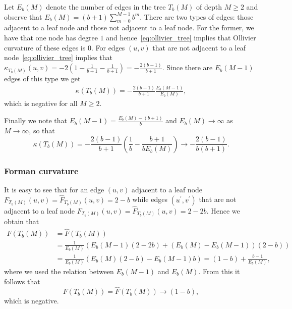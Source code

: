 \documentclass[runningheads]{llncs}
\begin{document}
Let $E_b(M)$ denote the number of edges in the tree $T_b(M)$ of depth $M \ge 2$ and observe that $E_b(M) = (b+1) \sum_{m =0}^{M-1} b^m$. There are two types of edges: those adjacent to a leaf node and those not adjacent to a leaf node. For the former, we have that one node has degree $1$ and hence~\eqref{eq:ollivier_tree} implies that Ollivier curvature of these edges is $0$. For edges $(u,v)$ that are not adjacent to a leaf node~\eqref{eq:ollivier_tree} implies that $\kappa_{T_b(M)}(u,v) = -2 \left(1 - \frac{1}{b+1} - \frac{1}{b+1} \right) = -\frac{2(b-1)}{b+1}$. Since there are $E_b(M-1)$ edges of this type we get
\begin{align*}
	\kappa(T_b(M)) = -\frac{2(b-1)}{b+1}\frac{E_b(M-1)}{E_b(M)},
\end{align*}
which is negative for all $M \ge 2$.

Finally we note that $E_b(M-1) = \frac{E_b(M) - (b+1)}{b}$ and $E_b(M) \to \infty$ as $M \to \infty$, so that
\[
	\kappa(T_b(M)) = -\frac{2(b-1)}{b+1} \left(\frac{1}{b} - \frac{b+1}{b E_b(M)}\right) \to -\frac{2(b-1)}{b(b+1)}.
\]


\subsubsection{Forman curvature} 
It is easy to see that for an edge $(u,v)$ adjacent to a leaf node $F_{T_b(M)}(u,v) = \hat{F}_{T_b(M)}(u,v) = 2 - b$ while edges $(u^\prime, v^\prime)$ that are not adjacent to a leaf node $F_{T_b(M)}(u,v) = \hat{F}_{T_b(M)}(u,v) = 2 - 2b$. Hence we obtain that
\begin{align*}
	F(T_b(M)) &= \hat{F}(T_b(M)) \\
	&= \frac{1}{E_b(M)} \left(E_b(M-1)(2-2b) + (E_b(M) - E_b(M-1))(2-b)\right)\\
	&= \frac{1}{E_b(M)} \left(E_b(M)(2-b) - E_b(M-1) b\right) = (1-b) + \frac{b-1}{E_b(M)},
\end{align*}
where we used the relation between $E_b(M-1)$ and $E_b(M)$. From this it follows that
\[
	F(T_b(M)) = \hat{F}(T_b(M)) \to (1-b),
\]
which is negative.


\end{document}
